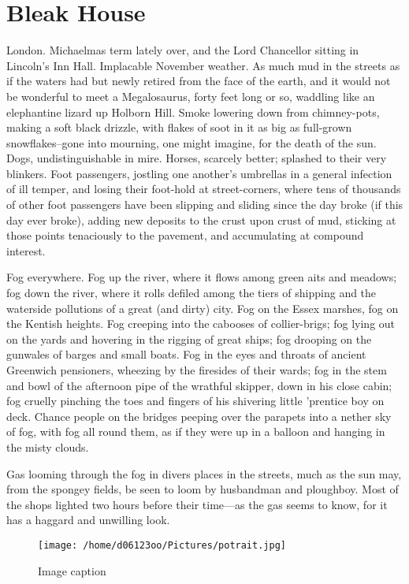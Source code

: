 \documentclass[a4paper]{article}
\begin{document}
\tableofcontents
\newpage
\section{Bleak House}
London. Michaelmas term lately over, and the Lord Chancellor sitting in Lincoln’s
Inn Hall. Implacable November weather. As much mud in the streets as if the
waters had but newly retired from the face of the earth, and it would not be
wonderful to meet a Megalosaurus, forty feet long or so, waddling like an
elephantine lizard up Holborn Hill. Smoke lowering down from chimney-pots,
making a soft black drizzle, with flakes of soot in it as big as full-grown
snowflakes–gone into mourning, one might imagine, for the death of the sun.
Dogs, undistinguishable in mire. Horses, scarcely better; splashed to their very
blinkers. Foot passengers, jostling one another’s umbrellas in a general infection of
ill temper, and losing their foot-hold at street-corners, where tens of thousands of
other foot passengers have been slipping and sliding since the day broke (if this day
ever broke), adding new deposits to the crust upon crust of mud, sticking at those
points tenaciously to the pavement, and accumulating at compound interest.

Fog everywhere. Fog up the river, where it flows among green aits and meadows;
fog down the river, where it rolls defiled among the tiers of shipping and the
waterside pollutions of a great (and dirty) city. Fog on the Essex marshes, fog on
the Kentish heights. Fog creeping into the cabooses of collier-brigs; fog lying out on
the yards and hovering in the rigging of great ships; fog drooping on the gunwales
of barges and small boats. Fog in the eyes and throats of ancient Greenwich
pensioners, wheezing by the firesides of their wards; fog in the stem and bowl of the
afternoon pipe of the wrathful skipper, down in his close cabin; fog cruelly
pinching the toes and fingers of his shivering little ’prentice boy on deck. Chance
people on the bridges peeping over the parapets into a nether sky of fog, with fog all
round them, as if they were up in a balloon and hanging in the misty clouds.

Gas looming through the fog in divers places in the streets, much as the sun may,
from the spongey fields, be seen to loom by husbandman and ploughboy. Most of
the shops lighted two hours before their time—as the gas seems to know, for it has a
haggard and unwilling look.

\begin{figure}
\centerline{\texttt{[image: /home/d06123oo/Pictures/potrait.jpg]}}
\caption{Image caption}
\label{figure:image}
\end{figure}
\end{document}
